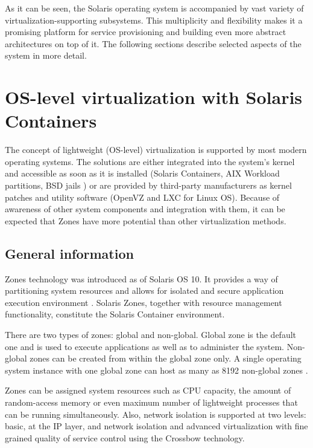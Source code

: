 \documentclass[11pt]{book}
\begin{document}
      As it can be seen, the Solaris operating system is accompanied by vast variety of virtualization-supporting
      subsystems. This multiplicity and flexibility makes it a promising platform for service provisioning and building
      even more abstract architectures on top of it. The following sections describe selected aspects of the system in
      more detail.


    \section{OS-level virtualization with Solaris Containers}
    \label{sec:sol:containers}


      The concept of lightweight (OS-level) virtualization is supported by most modern operating systems. The solutions
      are either integrated into the system's kernel and accessible as soon as it is installed (Solaris Containers, AIX
      Workload partitions, BSD jails \cite{kamp}) or are provided by third-party manufacturers as kernel patches and
      utility software (OpenVZ and LXC for Linux OS). Because of awareness of other system components and integration 
      with them, it can be expected that Zones have more potential than other virtualization methods.


      \subsection{General information}
      \label{sub:}

        Zones technology was introduced as of Solaris OS 10. It provides a way of partitioning system resources and
        allows for isolated and secure application execution environment \cite{sag}. Solaris Zones, together with
        resource management functionality, constitute the Solaris Container environment.

        There are two types of zones: global and non-global. Global zone is the default one and is used to execute
        applications as well as to administer the system. Non-global zones can be created from within the global zone
        only. A single operating system instance with one global zone can host as many as 8192 non-global zones
        \cite{sag}.

        Zones can be assigned system resources such as CPU capacity, the amount of random-access memory or even maximum
        number of lightweight processes that can be running simultaneously. Also, network isolation is supported at two
        levels: basic, at the IP layer, and network isolation and advanced virtualization with fine grained quality of
        service control using the Crossbow technology.
\end{document}
